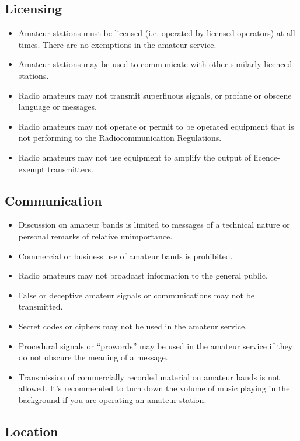 \documentclass[letterpaper,12pt]{scrartcl}
\begin{document}
\subsection{Licensing}

\begin{itemize}
\item Amateur stations must be licensed (i.e. operated by licensed operators) at all times. There are no exemptions in the amateur service.
\item Amateur stations may be used to communicate with other similarly licenced stations.
\item Radio amateurs may not transmit superfluous signals, or profane or obscene language or messages.
\item Radio amateurs may not operate or permit to be operated equipment that is not performing to the Radiocommunication Regulations.
\item Radio amateurs may not use equipment to amplify the output of licence-exempt transmitters.
\end{itemize}

\subsection{Communication}

\begin{itemize}
\item Discussion on amateur bands is limited to messages of a technical nature or personal remarks of relative unimportance.
\item Commercial or business use of amateur bands is prohibited.
\item Radio amateurs may not broadcast information to the general public.
\item False or deceptive amateur signals or communications may not be transmitted.
\item Secret codes or ciphers may not be used in the amateur service.
\item Procedural signals or ``prowords'' may be used in the amateur service if they do not obscure the meaning of a message.
\item Transmission of commercially recorded material on amateur bands is not allowed. It's recommended to turn down the volume of
music playing in the background if you are operating an amateur station.
\end{itemize}

\subsection{Location}
\end{document}
